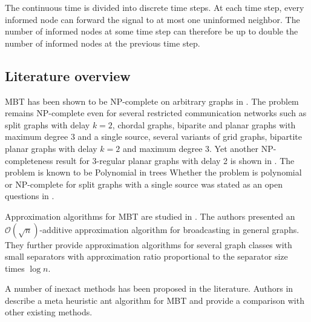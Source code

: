 The continuous time is divided into discrete time steps.
At each time step, every informed node can forward the signal to at most one uninformed neighbor.
The number of informed nodes at some time step can therefore be up to double the number of informed nodes at the previous time step.
%

\subsection{Literature overview}

MBT has been shown to be NP-complete on arbitrary graphs in \cite{slater81}. 
The problem remains NP-complete even for several restricted communication networks \cite{jansen95} such as
split graphs with delay $k=2$, chordal graphs,
biparite and planar graphs with maximum degree 3 and a single source,
several variants of grid graphs,
bipartite planar graphs with delay $k=2$ and maximum degree 3. 
Yet another NP-completeness result for 3-regular planar graphs with delay 2 is shown in \cite{middendorf93}.
The problem is known to be Polynomial in trees
Whether the problem is polynomial or NP-complete for split graphs with a single source was stated as an open questions in \cite{jansen95}.

Approximation algorithms for MBT are studied in \cite{kortsarz95}. 
The authors presented an $\mathcal{O}(\sqrt{n})$-additive approximation algorithm for broadcasting in general graphs.
They further provide approximation algorithms for several graph classes with small separators with approximation ratio proportional to the separator size times $\log n$.

A number of inexact methods has been proposed in the literature.
Authors in \cite{hasson04} describe a meta heuristic ant algorithm for MBT and provide a comparison with other existing methods.

